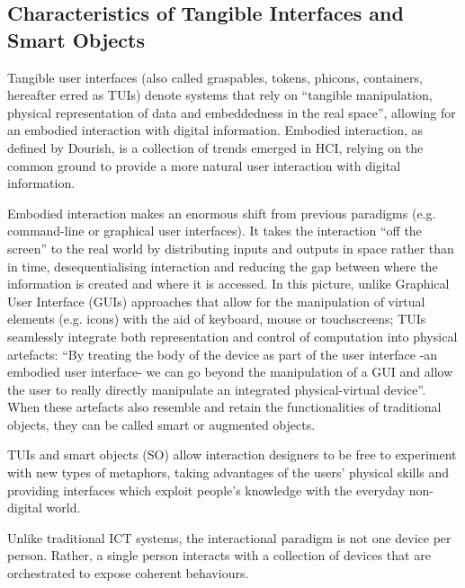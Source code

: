 \subsection{Characteristics of Tangible Interfaces and Smart Objects}
Tangible user interfaces (also called graspables, tokens, phicons, containers, hereafter erred as TUIs) denote systems that rely on ``tangible manipulation, physical representation of data and embeddedness in the real space'', allowing for an embodied interaction with digital information. Embodied interaction, as defined by Dourish\cite{dourish_where_2004}, is a collection of trends emerged in HCI, relying on the common ground to provide a more natural user interaction with digital information.

Embodied interaction makes an enormous shift from previous paradigms (e.g. command-line or graphical user interfaces). It takes the interaction ``off the screen'' to the real world by distributing inputs and outputs in space rather than in time, desequentialising interaction and reducing the gap between where the information is created and where it is accessed. In this picture, unlike Graphical User Interface (GUIs) approaches that allow for the manipulation of virtual elements (e.g. icons) with the aid of keyboard, mouse or touchscreens; TUIs seamlessly integrate both representation and control of computation into physical artefacts: ``By treating the body of the device as part of the user interface -an embodied user interface- we can go beyond the manipulation of a GUI and allow the user to really directly manipulate an integrated physical-virtual device''.
When these artefacts also resemble and retain the functionalities of traditional objects, they can be called smart or augmented objects.

TUIs and smart objects (SO) allow interaction designers to be free to experiment with new types of metaphors, taking advantages of the users' physical skills and providing interfaces which exploit people's knowledge with the everyday non-digital world.

Unlike traditional ICT systems, the interactional paradigm is not one device per person. Rather, a single person interacts with a collection of devices that are orchestrated to expose coherent behaviours.